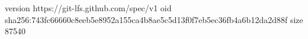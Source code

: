 version https://git-lfs.github.com/spec/v1
oid sha256:743fc66660c8eeb5e8952a155ca4b8ae5c5d13f0f7eb5ec36fb4a6b12da2d88f
size 87540
